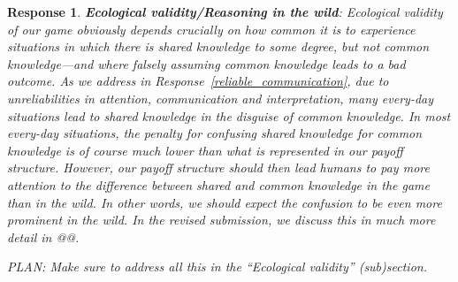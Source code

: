 \documentclass[a4paper]{article}
\newtheorem{response}{Response}
\begin{document}
 \begin{response}
{\bfseries Ecological validity/Reasoning in the wild}: Ecological validity of our game obviously depends crucially on how common it is to experience situations in which there is shared knowledge to some degree, but not common knowledge---and where falsely assuming common knowledge leads to a bad outcome. As we address in Response~\ref{reliable_communication}, due to unreliabilities in attention, communication and interpretation, many every-day situations lead to shared knowledge in the disguise of common knowledge. In most every-day situations, the penalty for confusing shared knowledge for common knowledge is of course much lower than what is represented in our payoff structure. However, our payoff structure should then lead humans to pay \emph{more} attention to the difference between shared and common knowledge in the game than in the wild. In other words, we should expect the confusion to be even more prominent in the wild. In the revised submission, we discuss this in much more detail in @@.

PLAN: Make sure to address all this in the ``Ecological validity'' (sub)section.  
 \end{response}

 
\end{document}

